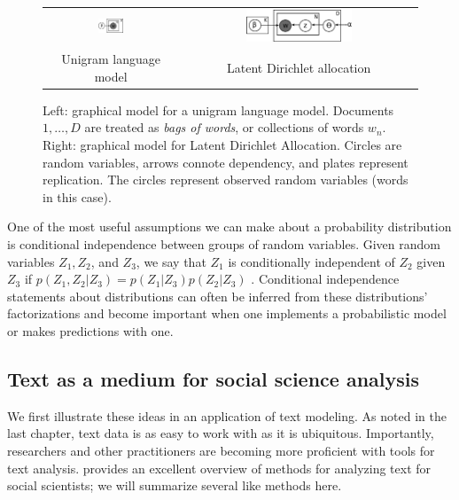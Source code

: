 \begin{figure}
  \begin{center}
    \begin{tabular}{cc}
      \includegraphics[width=0.2\textwidth]{chapter_introductory_material/figs/bagofwords_gm.pdf} & 
      \includegraphics[width=0.4667\textwidth]{chapter_introductory_material/figs/lda_gm.pdf} \\
      Unigram language model & Latent Dirichlet allocation \\
    \end{tabular}
  \end{center}
  \caption{Left: graphical model for a unigram language model.
    Documents $1, \ldots, D$ are treated as \emph{bags of words}, or
    collections of words $w_n$.  Right: graphical model for Latent
    Dirichlet Allocation.  Circles are random variables, arrows
    connote dependency, and plates represent replication.  The circles
    represent observed random variables (words in this case).}
  \label{fig:bagofwords_lda_gm}
\end{figure}

One of the most useful assumptions we can make about a probability
distribution is conditional independence between groups of random
variables.  Given random variables $Z_1, Z_2$, and $Z_3$, we say that
$Z_1$ is conditionally independent of $Z_2$ given $Z_3$ if $p(Z_1, Z_2
| Z_3) = p(Z_1 | Z_3) p(Z_2 | Z_3)$ \cite{bishop:2006}.  Conditional
independence statements about distributions can often be inferred from
these distributions' factorizations \cite{bishop:2006} and become
important when one implements a probabilistic model or makes
predictions with one.

\subsection{Text as a medium for social science analysis}
  \label{section:text_intro}
  We first illustrate these ideas in an application of text modeling.
  As noted in the last chapter, text data is as easy to work with as
  it is ubiquitous. Importantly, researchers and other practitioners
  are becoming more proficient with tools for text analysis.
  \cite{grimmer:submitted} provides an excellent overview of methods
  for analyzing text for social scientists; we will summarize several
  like methods here.

